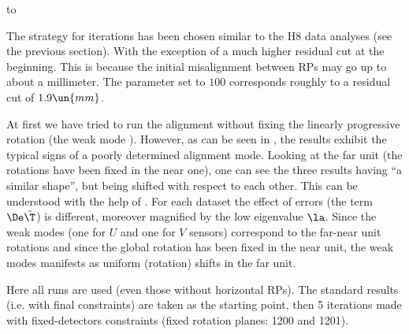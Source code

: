 \hbox to

\vskip1mm\noindent The strategy for iterations has been chosen similar to the H8 data analyses (see the previous section). With the exception of a much higher residual cut at the beginning. This is because the initial misalignment between RPs may go up to about a millimeter. The  parameter set to $100$ corresponds roughly to a residual cut of $1.9\un{mm}$.

At first we have tried to run the alignment without fixing the linearly progressive rotation (the weak mode ). However, as can be seen in , the results exhibit the typical signs of a poorly determined alignment mode. Looking at the far unit (the rotations have been fixed in the near one), one can see the three results having ``a similar shape'', but being shifted with respect to each other. This can be understood with the help of . For each dataset the effect of errors (the term $\De\tilde\T$) is different, moreover magnified by the low eigenvalue $\la$. Since the weak modes (one for $U$ and one for $V$ sensors) correspond to the far-near unit rotations and since the global rotation has been fixed in the near unit, the weak modes manifests as uniform (rotation) shifts in the far unit.

Here all runs are used (even those without horizontal RPs). The standard results (i.e. with final constraints) are taken as the starting point, then 5 iterations made with fixed-detectors constraints (fixed rotation planes: 1200 and 1201). 


